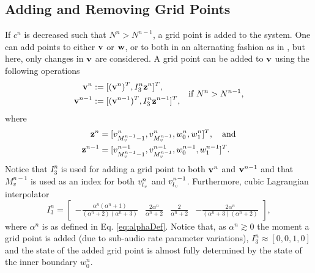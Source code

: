 \documentclass[fleqn]{jaes}
\def\SBcomment[#1]{\textcolor{red}{#1}}
\def\SWcomment[#1]{\textcolor{blue}{#1}}
\begin{document}
\subsection{Adding and Removing Grid Points}\label{sec:addRemove}
If $c^n$ is decreased such that $N^n > N^{n-1}$, a grid point is added to the system. One can add points to either $\mathbf{v}$ or $\mathbf{w}$, or to both in an alternating fashion as in \cite{Willemsen2021a}, but here, only changes in $\mathbf{v}$ are considered. A grid point can be added to $\mathbf{v}$ using the following operations
\begin{equation}
\begin{aligned}
    \v^n &:= [(\v^n)^T, I_3^n\z^n]^T,\\
    \v^{n-1} &:= [(\v^{n-1})^T, I_3^n\z^{n-1}]^T,\\
\end{aligned} \quad \text{if } N^n > N^{n-1},
\end{equation}
where
\begin{equation*}
    \begin{aligned}
        \z^n &= [v_{M_v^{n-1}-1}^n, v_{M_v^{n-1}}^n, w_0^n, w_1^n]^T, \quad \text{and}\\
        \z^{n-1} &= [v_{M_v^{n-1}-1}^{n-1}, v_{M_v^{n-1}}^{n-1}, w_0^{n-1}, w_1^{n-1}]^T.
    \end{aligned}
\end{equation*}
Notice that $I_3^n$ is used for adding a grid point to both $\mathbf{v}^n$ and $\mathbf{v}^{n-1}$ and that $M_v^{n-1}$ is used as an index for both $v^n_{l_v}$ and $v^{n-1}_{l_v}$.
Furthermore, cubic Lagrangian interpolator
\begin{equation}\label{eq:customIp}
    I_3^n = \begin{bmatrix} -\frac{\alpha^n(\alpha^n+1)}{(\alpha^n+2)(\alpha^n+3)} &\frac{2\alpha^n}{\alpha^n+2} &\frac{2}{\alpha^n+2} 
    &-\frac{2\alpha^n}{(\alpha^n+3)(\alpha^n+2)}
    \end{bmatrix},
\end{equation}
where $\alpha^n$ is as defined in Eq. \eqref{eq:alphaDef}. Notice that, as $\alpha^n \gtrsim 0$ the moment a grid point is added (due to sub-audio rate parameter variations), $I_3^n\approx [0, 0, 1, 0]$ and the state of the added grid point is almost fully determined by the state of the inner boundary $w_0^n$. 
\end{document}
